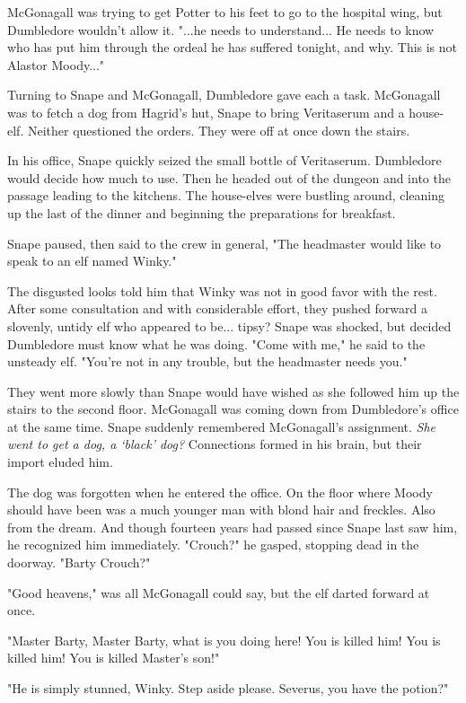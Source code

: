 McGonagall was trying to get Potter to his feet to go to the hospital wing, but Dumbledore wouldn't allow it. "...he needs to understand... He needs to know who has put him through the ordeal he has suffered tonight, and why. This is not Alastor Moody..."

Turning to Snape and McGonagall, Dumbledore gave each a task. McGonagall was to fetch a dog from Hagrid's hut, Snape to bring Veritaserum and a house-elf. Neither questioned the orders. They were off at once down the stairs.

In his office, Snape quickly seized the small bottle of Veritaserum. Dumbledore would decide how much to use. Then he headed out of the dungeon and into the passage leading to the kitchens. The house-elves were bustling around, cleaning up the last of the dinner and beginning the preparations for breakfast.

Snape paused, then said to the crew in general, "The headmaster would like to speak to an elf named Winky."

The disgusted looks told him that Winky was not in good favor with the rest. After some consultation and with considerable effort, they pushed forward a slovenly, untidy elf who appeared to be... tipsy? Snape was shocked, but decided Dumbledore must know what he was doing. "Come with me," he said to the unsteady elf. "You're not in any trouble, but the headmaster needs you."

They went more slowly than Snape would have wished as she followed him up the stairs to the second floor. McGonagall was coming down from Dumbledore's office at the same time. Snape suddenly remembered McGonagall's assignment. \emph{She went to get a dog, a `black' dog? }Connections formed in his brain, but their import eluded him.

The dog was forgotten when he entered the office. On the floor where Moody should have been was a much younger man with blond hair and freckles. Also from the dream. And though fourteen years had passed since Snape last saw him, he recognized him immediately. "Crouch?" he gasped, stopping dead in the doorway. "Barty Crouch?"

"Good heavens," was all McGonagall could say, but the elf darted forward at once.

"Master Barty, Master Barty, what is you doing here! You is killed him! You is killed him! You is killed Master's son!"

"He is simply stunned, Winky. Step aside please. Severus, you have the potion?"

